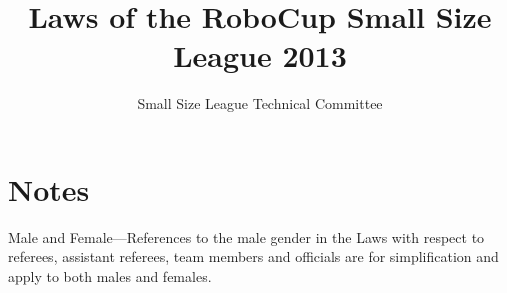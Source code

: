 \documentclass[12pt]{article}
\begin{document}
\setcounter{page}{1}

\title{Laws of the RoboCup Small Size League 2013}
\author{Small Size League Technical Committee}

\maketitle

\vfill

\tableofcontents

\section*{Notes}
Male and Female---References to the male gender in the Laws with respect to referees, assistant referees, team members and officials are for simplification and apply to both males and females.

\thispagestyle{fancy}

\clearpage

\cfoot{\thepage}
\setcounter{page}{1}



















\appendix



\end{document}
